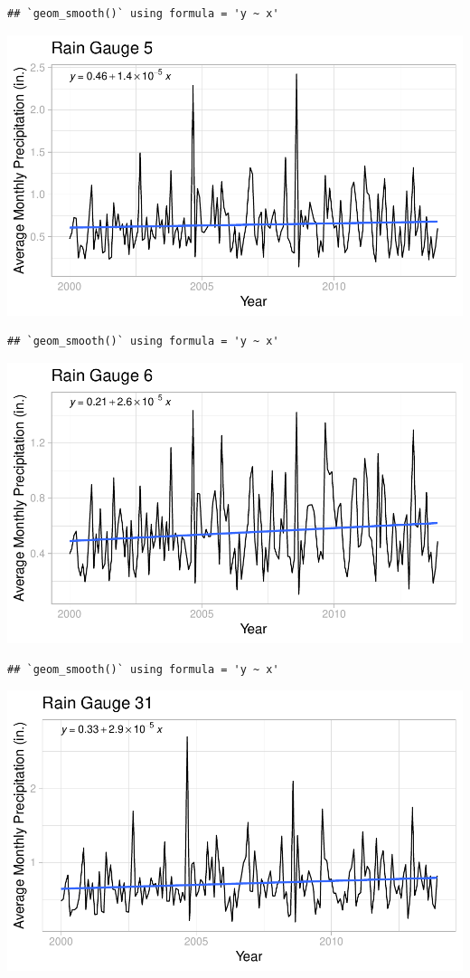 \documentclass[
  12pt,
]{article}
\begin{document}
\begin{verbatim}
## `geom_smooth()` using formula = 'y ~ x'
\end{verbatim}

\includegraphics{Project_Template_files/figure-latex/Average Monthly Precipitation Plots-1.pdf}

\begin{verbatim}
## `geom_smooth()` using formula = 'y ~ x'
\end{verbatim}

\includegraphics{Project_Template_files/figure-latex/Average Monthly Precipitation Plots-2.pdf}

\begin{verbatim}
## `geom_smooth()` using formula = 'y ~ x'
\end{verbatim}

\includegraphics{Project_Template_files/figure-latex/Average Monthly Precipitation Plots-3.pdf}
\end{document}
